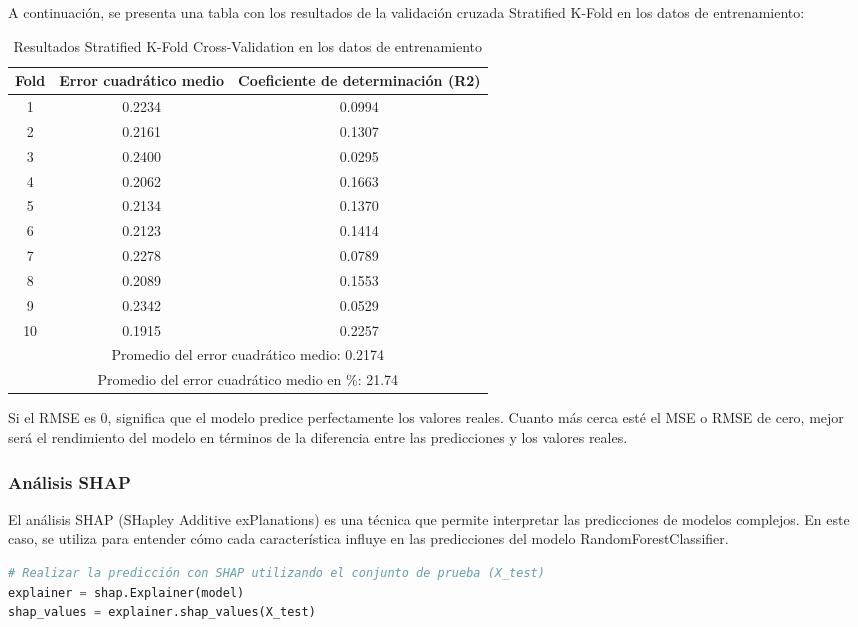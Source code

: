 A continuación, se presenta una tabla con los resultados de la validación cruzada Stratified K-Fold en los datos de entrenamiento:

\begin{table}[h]
    \centering
    \caption{Resultados Stratified K-Fold Cross-Validation en los datos de entrenamiento}
    \label{lst:res_skfold_train}%
    \begin{tabular}{ccc}
        \hline
        \textbf{Fold} & \textbf{Error cuadrático medio} & \textbf{Coeficiente de determinación (R2)} \\
        \hline
        1 & 0.2234 & 0.0994 \\
        2 & 0.2161 & 0.1307 \\
        3 & 0.2400 & 0.0295 \\
        4 & 0.2062 & 0.1663 \\
        5 & 0.2134 & 0.1370 \\
        6 & 0.2123 & 0.1414 \\
        7 & 0.2278 & 0.0789 \\
        8 & 0.2089 & 0.1553 \\
        9 & 0.2342 & 0.0529 \\
        10 & 0.1915 & 0.2257 \\
        \hline
        \multicolumn{3}{c}{Promedio del error cuadrático medio: 0.2174} \\
        \multicolumn{3}{c}{Promedio del error cuadrático medio en \%: 21.74} \\
        \hline
    \end{tabular}%
\end{table}%


Si el RMSE es 0, significa que el modelo predice perfectamente los valores reales. Cuanto más cerca esté el MSE o RMSE de cero, mejor será el rendimiento del modelo en términos de la diferencia entre las predicciones y los valores reales.


\subsubsection{Análisis SHAP}

El análisis SHAP (SHapley Additive exPlanations) es una técnica que permite interpretar las predicciones de modelos complejos. En este caso, se utiliza para entender cómo cada característica influye en las predicciones del modelo RandomForestClassifier.

\begin{lstlisting}[language=Python, caption=Predicción con SHAP utilizando el conjunto de prueba, label=lst:shap_analysis]
# Realizar la predicción con SHAP utilizando el conjunto de prueba (X_test)
explainer = shap.Explainer(model)
shap_values = explainer.shap_values(X_test)
\end{lstlisting}


